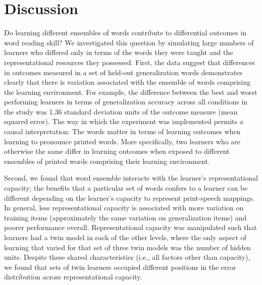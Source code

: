 \documentclass[
  ,man,floatsintext]{apa6}
\begin{document}
\section{Discussion}\label{discussion}

Do learning different ensembles of words contribute to differential outcomes in word reading skill? We investigated this question by simulating large numbers of learners who differed only in terms of the words they were taught and the representational resources they possessed. First, the data suggest that differences in outcomes measured in a set of held-out generalization words demonstrates clearly that there is variation associated with the ensemble of words comprising the learning environment. For example, the difference between the best and worst performing learners in terms of generalization accuracy across all conditions in the study was 1.36 standard deviation units of the outcome measure (mean squared error). The way in which the experiment was implemented permits a causal interpretation: The words matter in terms of learning outcomes when learning to pronounce printed words. More specifically, two learners who are otherwise the same differ in learning outcomes when exposed to different ensembles of printed words comprising their learning environment.

Second, we found that word ensemble interacts with the learner's representational capacity; the benefits that a particular set of words confers to a learner can be different depending on the learner's capacity to represent print-speech mappings. In general, less representational capacity is associated with more variation on training items (approximately the same variation on generalization items) and poorer performance overall. Representational capacity was manipulated such that learners had a twin model in each of the other levels, where the only aspect of learning that varied for that set of three twin models was the number of hidden units. Despite these shared characteristics (i.e., all factors other than capacity), we found that sets of twin learners occupied different positions in the error distribution across representational capacity.
\end{document}
